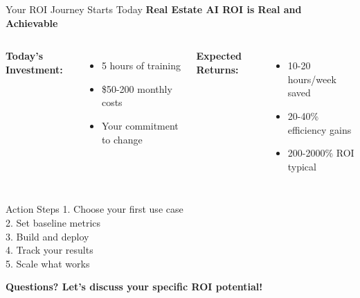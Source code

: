 \documentclass{beamer}
\begin{document}
\begin{frame}{Your ROI Journey Starts Today}
  \Large
  \centering
  \textbf{Real Estate AI ROI is Real and Achievable}
  
  \vspace{0.5cm}
  
  \normalsize
  \begin{columns}[onlytextwidth]
      \textbf{Today's Investment:}
      \begin{itemize}
        \item 5 hours of training
        \item \$50-200 monthly costs
        \item Your commitment to change
      \end{itemize}
    
      \textbf{Expected Returns:}
      \begin{itemize}
        \item 10-20 hours/week saved
        \item 20-40\% efficiency gains
        \item 200-2000\% ROI typical
      \end{itemize}
  \end{columns}
  
  \vspace{0.5cm}
  
  \begin{block}{Action Steps}
    1. Choose your first use case\\
    2. Set baseline metrics\\
    3. Build and deploy\\
    4. Track your results\\
    5. Scale what works
  \end{block}
  
  \vspace{0.3cm}
  \textbf{Questions? Let's discuss your specific ROI potential!}
\end{frame}
\end{document}
